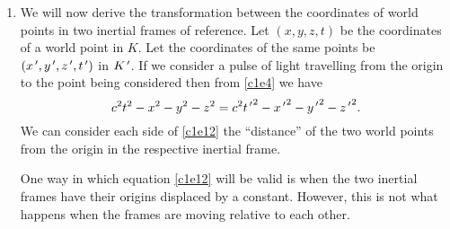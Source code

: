 \begin{enumerate}
\item We will now derive the transformation between the coordinates of world
points in two inertial frames of reference. Let $(x, y, z, t)$ be the coordinates
of a world point in $K$. Let the coordinates of the same points be $(x^{\,\prime}, y^{\,\prime},
z^{\,\prime}, t^{\,\prime})$ in $K^{\,\prime}$. If we consider a pulse of light travelling from the 
origin to the point being considered then from \eqref{c1e4} we have
\begin{equation}\label{c1e12}
c^2t^2 - x^2 - y^2 - z^2 = c^2{t^{\,\prime}}^2 - {x^{\,\prime}}^2 - {y^{\,\prime}}^2 - {z^{\,\prime}}^2.
\end{equation}
We can consider each side of \eqref{c1e12} the ``distance'' of the two world 
points from the origin in the respective inertial frame. 

One way in which equation \eqref{c1e12} will be valid is when the two inertial
frames have their origins displaced by a constant. However, this is not what
happens when the frames are moving relative to each other.


\end{enumerate}
